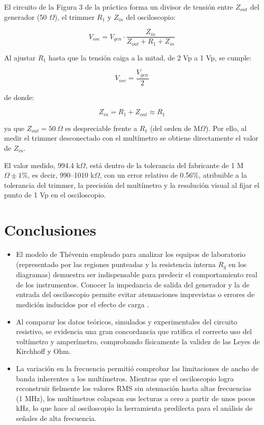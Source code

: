 \documentclass[journal, a4paper]{IEEEtran}
\begin{document}
El circuito de la Figura 3 de la práctica forma un divisor de tensión entre $Z_{out}$ del generador (50 $\Omega$), el trimmer $R_1$ y $Z_{in}$ del osciloscopio:

\begin{equation}
V_{osc} = V_{gen} \cdot \frac{Z_{in}}{Z_{out} + R_1 + Z_{in}}
\label{eq:divisor_osc}
\end{equation}

Al ajustar $R_1$ hasta que la tensión caiga a la mitad, de 2 Vp a 1 Vp, se cumple:

\begin{equation}
V_{osc} = \frac{V_{gen}}{2}
\end{equation}

de donde:

\begin{equation}
Z_{in} = R_1 + Z_{out} \approx R_1
\end{equation}

ya que $Z_{out} = 50\ \Omega$ es despreciable frente a $R_1$ (del orden de M$\Omega$). Por ello, al medir el trimmer desconectado con el multímetro se obtiene directamente el valor de $Z_{in}$.

El valor medido, 994.4 k$\Omega$, está dentro de la tolerancia del fabricante de 1 M$\Omega \pm 1\%$, es decir, 990--1010 k$\Omega$, con un error relativo de 0.56\%, atribuible a la tolerancia del trimmer, la precisión del multímetro y la resolución visual al fijar el punto de 1 Vp en el osciloscopio.

\section{Conclusiones}
\begin{itemize}
    \item El modelo de Thévenin empleado para analizar los equipos de laboratorio (representado por las regiones punteadas y la resistencia interna $R_g$ en los diagramas) demuestra ser indispensable para predecir el comportamiento real de los instrumentos. Conocer la impedancia de salida del generador y la de entrada del osciloscopio permite evitar atenuaciones imprevistas o errores de medición inducidos por el efecto de carga \cite{sedra2020}.
    \item Al comparar los datos teóricos, simulados y experimentales del circuito resistivo, se evidencia una gran concordancia que ratifica el correcto uso del voltímetro y amperímetro, comprobando físicamente la validez de las Leyes de Kirchhoff y Ohm.
    \item La variación en la frecuencia permitió comprobar las limitaciones de ancho de banda inherentes a los multímetros. Mientras que el osciloscopio logra reconstruir fielmente los valores RMS sin atenuación hasta altas frecuencias (1 MHz), los multímetros colapsan sus lecturas a cero a partir de unos pocos kHz, lo que hace al osciloscopio la herramienta predilecta para el análisis de señales de alta frecuencia.
\end{itemize}
\end{document}
